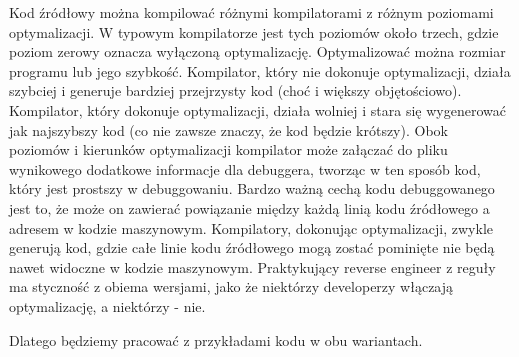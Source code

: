 Kod źródłowy można kompilować różnymi kompilatorami z różnym poziomami optymalizacji.
W typowym kompilatorze jest tych poziomów około trzech, gdzie poziom zerowy oznacza wyłączoną optymalizację.
Optymalizować można rozmiar programu lub jego szybkość.
Kompilator, który nie dokonuje optymalizacji, działa szybciej i generuje bardziej przejrzysty kod (choć i większy objętościowo).
Kompilator, który dokonuje optymalizacji, działa wolniej i stara się wygenerować jak najszybszy kod (co nie zawsze znaczy, że kod będzie krótszy).
Obok poziomów i kierunków optymalizacji kompilator może załączać do pliku wynikowego dodatkowe informacje dla debuggera,
tworząc w ten sposób kod, który jest prostszy w debuggowaniu.
Bardzo ważną cechą kodu debuggowanego jest to, że może on zawierać powiązanie
między każdą linią kodu źródłowego a adresem w kodzie maszynowym.
Kompilatory, dokonując optymalizacji, zwykle generują kod, gdzie całe linie kodu źródłowego mogą zostać pominięte nie będą nawet widoczne w kodzie maszynowym.
Praktykujący reverse engineer z reguły ma styczność z obiema wersjami, jako że niektórzy developerzy włączają optymalizację, a niektórzy - nie.

Dlatego będziemy pracować z przykładami kodu w obu wariantach.
